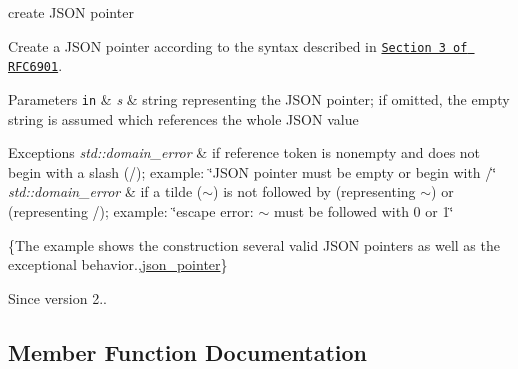 create J\+S\+ON pointer 

Create a J\+S\+ON pointer according to the syntax described in \href{https://tools.ietf.org/html/rfc6901#section-3}{\tt Section 3 of R\+F\+C6901}.


\begin{DoxyParams}[1]{Parameters}
\mbox{\tt in}  & {\em s} & string representing the J\+S\+ON pointer; if omitted, the empty string is assumed which references the whole J\+S\+ON value\\
\hline
\end{DoxyParams}

\begin{DoxyExceptions}{Exceptions}
{\em std\+::domain\+\_\+error} & if reference token is nonempty and does not begin with a slash ({\ttfamily /}); example\+: {\ttfamily \char`\"{}\+J\+S\+O\+N pointer must be empty or
begin with /\char`\"{}} \\
\hline
{\em std\+::domain\+\_\+error} & if a tilde ({\ttfamily $\sim$}) is not followed by {} (representing {\ttfamily $\sim$}) or {} (representing {\ttfamily /}); example\+: {\ttfamily \char`\"{}escape error\+:
$\sim$ must be followed with 0 or 1\char`\"{}}\\
\hline
\end{DoxyExceptions}
\{The example shows the construction several valid J\+S\+ON pointers as well as the exceptional behavior.,\hyperlink{classnlohmann_1_1basic__json_1_1json__pointer}{json\+\_\+pointer}\}

\begin{DoxySince}{Since}
version 2.. 
\end{DoxySince}


\subsection{Member Function Documentation}
\hypertarget{classnlohmann_1_1basic__json_1_1json__pointer_a1c1baaa26120bac0a5d553eac1dae507}{}\label{classnlohmann_1_1basic__json_1_1json__pointer_a1c1baaa26120bac0a5d553eac1dae507} 
